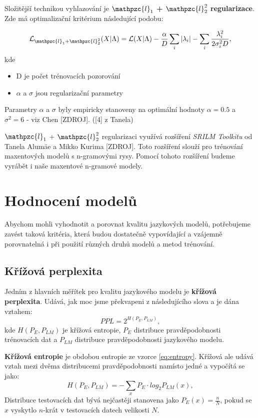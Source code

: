\documentclass[12pt,a4paper]{report}
\begin{document}
Složitější technikou vyhlazování je \textbf{$\mathpzc{l}_1$ + $\mathpzc{l}_2^2$ regularizace}. Zde má optimalizační kritérium následující podobu:

\begin{equation}
\mathcal{L}_{\mathpzc{l}_1 + \mathpzc{l}_2^2} (X|\Lambda) = \mathcal{L}(X|\Lambda) - \frac{\alpha}{D} \sum_i |\lambda_i| - \sum_i \frac{\lambda_i^2}{2\sigma_i^2 D},
\end{equation}
kde \begin{itemize}
\item{D je počet trénovacích pozorování}
\item{$\alpha$ a $\sigma$ jsou regularizační parametry}
\end{itemize}
Parametry $\alpha$ a $\sigma$ byly empiricky stanoveny na optimální hodnoty $\alpha = 0.5$ a $\sigma^2 = 6$ - viz Chen [ZDROJ]. ([4] z Tanela)

$\mathpzc{l}_1$ + $\mathpzc{l}_2^2$ regularizaci využívá rozšíření \textit{SRILM Toolkitu} od Tanela Alumäe a Mikko Kurima [ZDROJ]. Toto rozšíření slouží pro trénování maxentových modelů s n-gramovými rysy. Pomocí tohoto rozšíření budeme vyrábět i naše maxentové n-gramové modely.

\section{Hodnocení modelů}
Abychom mohli vyhodnotit a porovnat kvalitu jazykových modelů, potřebujeme zavést taková kritéria, která budou dostatečně vypovídající a vzájemně porovnatelná i při použití různých druhů modelů a metod trénování.
\subsection{Křížová perplexita}
Jedním z hlavních měřítek pro kvalitu jazykového modelu je \textbf{křížová perplexita}. Udává, jak moc jsme překvapeni z následujícího slova a je dána vztahem:
\begin{equation}
PPL = 2^{H(P_E, P_{LM})},
\end{equation}
kde $H(P_E, P_{LM})$ je křížová entropie, $P_E$ distribuce pravděpodobnosti trénovacích dat a $P_{LM}$ distribuce pravděpodobnosti jazykového modelu.

\textbf{Křížová entropie} je obdobou entropie ze vzorce \eqref{eq:entropy}. Křížová ale udává vztah mezi dvěma distribucemi pravděpodobnosti namísto jedné a vypočítá se jako:
\begin{equation}
H(P_E, P_{LM}) = -\sum_x {P_E} \cdot log_2 P_{LM}(x),
\end{equation}
Distribuce testovacích dat bývá nejčastěji stanovena jako $P_E(x) = \frac{n}{N}$, pokud se $x$ vyskytlo $n$-krát v testovacích datech velikosti $N$.
\end{document}

